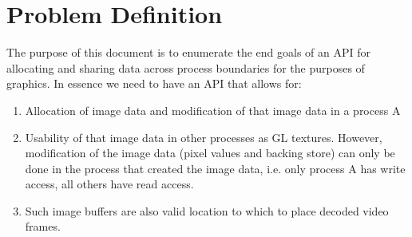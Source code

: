 \documentclass[a4paper,11pt]{article}
\begin{document}
\newpage

\renewcommand{\contentsname}{Table of Contents}
{
\singlespacing
\tableofcontents
}

\setlength{\parindent}{0pt}

\newpage

\section{Problem Definition}
\begin{indenter}{2cm}

The purpose of this document is to enumerate the end goals of an API for allocating and sharing data across process
boundaries for the purposes of graphics. In essence we need to have an API that allows for:
\begin{enumerate}
\item Allocation of image data and modification of that image data in a process A
\item Usability of that image data in other processes as GL textures. However, modification of the image data (pixel values and backing store) can only be done in the process that created the image data, i.e. only process A has write access, all others have read access.
\item Such image buffers are also valid location to which to place decoded video frames.
\end{enumerate}

\end{indenter}
\end{document}
